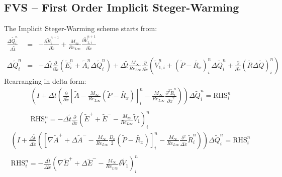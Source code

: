 \documentclass[11pt, a4paper]{article}
\newcommand{\parder}[2]{\frac{\partial {#1}}{\partial {#2}}}
\begin{document}
\subsection{FVS -- First Order Implicit Steger-Warming}
The Implicit Steger-Warming scheme starts from:
\begin{equation}
    \begin{array}{lcl}
        \displaystyle\frac{\Delta\tilde{Q}_i^n}{\Delta\tilde{t}} & = & \displaystyle-\parder{\tilde{E}_i^{n+1}}{\tilde{x}}+\frac{M_\infty}{Re_{L\infty}}\parder{\tilde{V}_{1,i}^{n+1}}{\tilde{x}} \\\\
        \displaystyle\Delta\tilde{Q}_i^n & = & \displaystyle-\Delta\tilde{t}\parder{}{\tilde{x}}\left(\tilde{E}_i^{n}+\tilde{A}_i^n\Delta\tilde{Q}_i^n\right)+\Delta\tilde{t}\frac{M_\infty}{Re_{L\infty}}\parder{}{\tilde{x}}\left(\tilde{V}_{1,i}^{n}+\left(\tilde{P}-\tilde{R_x}\right)_i^n\Delta\tilde{Q}_i^n+\parder{}{\tilde{x}}\left(\tilde{R}\Delta\tilde{Q}\right)_i^n\right)
    \end{array}
\end{equation}
Rearranging in delta form:
\begin{equation}
    \begin{array}{c}
        \displaystyle\left(I+\Delta\tilde{t}\left(\parder{}{\tilde{x}}\left[\tilde{A}-\frac{M_\infty}{Re_{L\infty}}\left(\tilde{P}-\tilde{R_x}\right)\right]_i^n-\frac{M_\infty}{Re_{L\infty}}\frac{\partial^2\tilde{R}_i^n}{\partial\tilde{x}^2}\right)\right)\Delta\tilde{Q}_i^n=\mathrm{RHS}_i^n \\\\
        \mathrm{RHS}_i^n=\displaystyle-\Delta\tilde{t}\parder{}{\tilde{x}}\left(\tilde{E}^{+}+\tilde{E}^{-}-\frac{M_\infty}{Re_{L\infty}}\tilde{V}_{1}\right)_i^n
    \end{array}
\end{equation}
\begin{equation}
    \begin{array}{c}
        \displaystyle\left(I+\frac{\Delta\tilde{t}}{\Delta\tilde{x}}\left(\left[\nabla\tilde{A}^{+}+\Delta\tilde{A}^{-}-\frac{M_\infty}{Re_{L\infty}}\frac{D_0}{2}\left(\tilde{P}-\tilde{R_x}\right)\right]_i^n-\frac{M_\infty}{Re_{L\infty}}\frac{\delta^2}{\Delta\tilde{x}}\tilde{R}_i^n\right)\right)\Delta\tilde{Q}_i^n=\mathrm{RHS}_i^n \\\\
        \mathrm{RHS}_i^n=\displaystyle-\frac{\Delta\tilde{t}}{\Delta\tilde{x}}\left(\nabla\tilde{E}^{+}+\Delta\tilde{E}^{-}-\frac{M_\infty}{Re_{L\infty}}\delta\tilde{V}_{1}\right)_i^n
    \end{array}
\end{equation}
\end{document}
